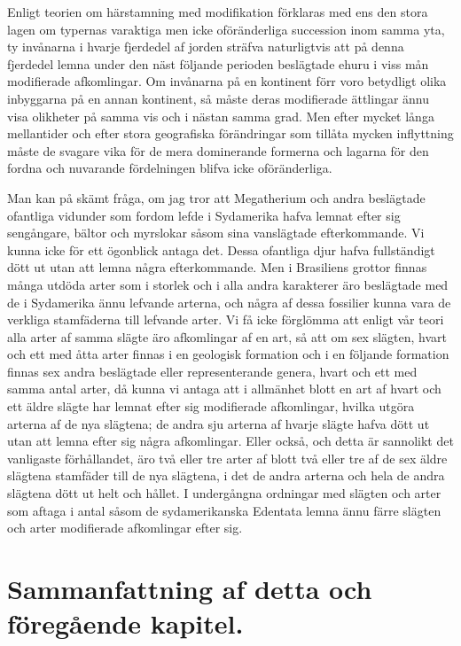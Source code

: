 Enligt teorien om härstamning med modifikation förklaras med ens den stora lagen om typernas varaktiga men icke oföränderliga succession inom samma yta, ty invånarna i hvarje fjerdedel af jorden sträfva naturligtvis att på denna fjerdedel lemna under den näst följande perioden beslägtade ehuru i viss mån modifierade afkomlingar. Om invånarna på en kontinent förr voro betydligt olika inbyggarna på en annan kontinent, så måste deras modifierade ättlingar ännu visa olikheter på samma vis och i nästan samma grad. Men efter mycket långa mellantider och efter stora geografiska förändringar som tillåta mycken inflyttning måste de svagare vika för de mera dominerande formerna och lagarna för den fordna och nuvarande fördelningen blifva icke oföränderliga.

Man kan på skämt fråga, om jag tror att Megatherium och andra beslägtade ofantliga vidunder som fordom lefde i Sydamerika hafva lemnat efter sig sengångare, bältor och myrslokar såsom sina vanslägtade efterkommande. Vi kunna icke för ett ögonblick antaga det. Dessa ofantliga djur hafva fullständigt dött ut utan att lemna några efterkommande. Men i Brasiliens grottor finnas många utdöda arter som i storlek och i alla andra karakterer äro beslägtade med de i Sydamerika ännu lefvande arterna, och några af dessa fossilier kunna vara de verkliga stamfäderna till lefvande arter. Vi få icke förglömma att enligt vår teori alla arter af samma slägte äro afkomlingar af en art, så att om sex slägten, hvart och ett med åtta arter finnas i en geologisk formation och i en följande formation finnas sex andra beslägtade eller representerande genera, hvart och ett med samma antal arter, då kunna vi antaga att i allmänhet blott en art af hvart och ett äldre slägte har lemnat efter sig modifierade afkomlingar, hvilka utgöra arterna af de nya slägtena; de andra sju arterna af hvarje slägte hafva dött ut utan att lemna efter sig några afkomlingar. Eller också, och detta är sannolikt det vanligaste förhållandet, äro två eller tre arter af blott två eller tre af de sex äldre slägtena stamfäder till de nya slägtena, i det de andra arterna och hela de andra slägtena dött ut helt och hållet. I undergångna ordningar med slägten och arter som aftaga i antal såsom de sydamerikanska Edentata lemna ännu färre slägten och arter modifierade afkomlingar efter sig.



\section[Sammanfattning]{Sammanfattning af detta och föregående kapitel.}

